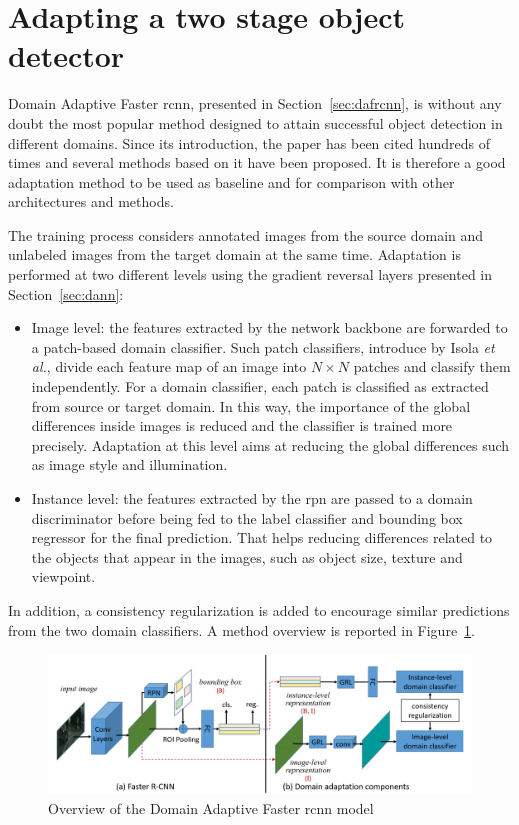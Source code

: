 \documentclass[%
    corpo=12pt,
    twoside,
    stile=classica,   
    tipotesi=magistrale,
    evenboxes,
    english,
	numerazioneromana,
]{toptesi}
\begin{document}
\section{Adapting a two stage object detector}
Domain Adaptive Faster \acrshort{rcnn}\cite{chen2018domain}, presented in Section~\ref{sec:dafrcnn}, is without any doubt the most popular method designed to attain successful object detection in different domains. Since its introduction, the paper has been cited hundreds of times and several methods based on it have been proposed. It is therefore a good adaptation method to be used as baseline and for comparison with other architectures and methods.

The training process considers annotated images from the source domain and unlabeled images from the target domain at the same time. Adaptation is performed at two different levels  using the gradient reversal layers presented in Section~\ref{sec:dann}:

\begin{itemize}
	\item Image level: the features extracted by the network backbone are forwarded to a patch-based domain classifier. Such patch classifiers, introduce by Isola \textit{et al.}\cite{isola2018imagetoimage}, divide each feature map of an image into $ N\times N $ patches and classify them independently. For a domain classifier, each patch is classified as extracted from source or target domain. In this way, the importance of the global differences inside images is reduced and the classifier is trained more precisely. Adaptation at this level aims at reducing the global differences such as image style and illumination.
	\item Instance level: the features extracted by the \gls{rpn} are passed to a domain discriminator before being fed to the label classifier and bounding box regressor for the final prediction. That helps reducing differences related to the objects that appear in the images, such as object size, texture and viewpoint.
\end{itemize}
In addition, a consistency regularization is added to encourage similar predictions from the two domain classifiers. A method overview is reported in Figure~\ref{fig:dafasterrcnn}.

\begin{figure}[ht]
	\centering
	\includegraphics[width=\linewidth]{imgs/dafasterrcnn.png}
	\caption{Overview of the Domain Adaptive Faster \gls{rcnn} model\cite{chen2018domain}}
	\label{fig:dafasterrcnn}
\end{figure}
\end{document}
